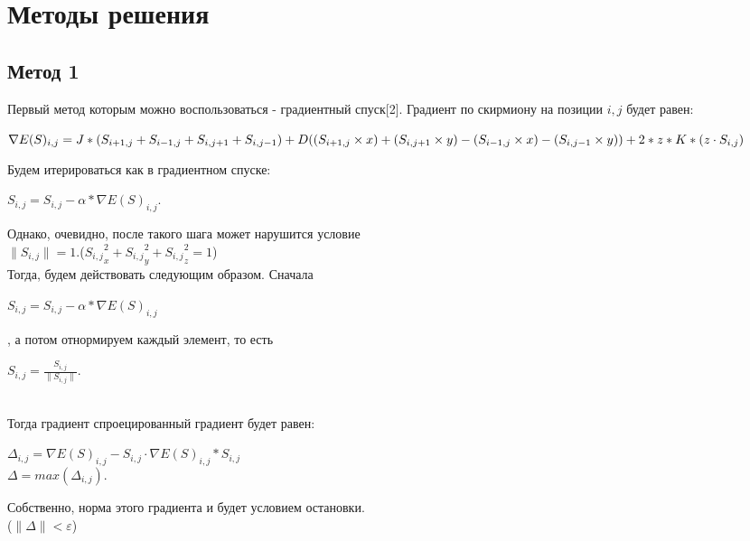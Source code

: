 \documentclass[ 12pt,x11names]{article}
\begin{document}
    \section{Методы решения}
    \subsection{Метод 1}
    Первый метод которым можно воспользоваться  - градиентный спуск[2]. Градиент по скирмиону на позиции $i, j$ будет равен:
      \begin{center}
    $\nabla E(S)_{i, j} = J * (S_{i + 1,j} + S_{i - 1,j} + S_{i, j + 1} + S_{i, j - 1})
        + \\ D  ( (S_{i + 1,j} \times x) + (S_{i, j + 1} \times y) -  (S_{i - 1, j} \times x) - (S_{i, j - 1} \times y) )\\
        + 2 * z * K * (z \cdot S_{i, j})$\\
          \end{center}
    Будем  итерироваться как в градиентном спуске:
    \begin{center}
    $S_{i, j} = S_{i, j} - \alpha * \nabla E(S)_{i, j}$.\\
    \end{center}
    Однако, очевидно, после такого шага может  нарушится условие\\ $\|S_{i, j}\| = 1$.(${S_{i,j}}_x^2 + {S_{i,j}}_y^2 + {S_{i,j}}_z^2 = 1$)\\
    Тогда, будем действовать следующим образом. Сначала \\
    \begin{center}
    $S_{i, j} = S_{i, j} - \alpha * \nabla E(S)_{i, j}$
    \end{center}, а потом отнормируем каждый элемент, то есть \begin{center}$S_{i, j} = \frac{S_{i, j}}{\|S_{i, j}\|}$.\end{center}\\
    Тогда градиент спроецированный градиент будет равен:\\
    \begin{center}
    $\Delta_{i, j} = \nabla E(S)_{i, j} - S_{i, j} \cdot \nabla E(S)_{i, j} * S_{i, j}$\\
    $\Delta = max(\Delta_{i, j}).$\\
    \end{center}
    Собственно, норма этого градиента и будет условием остановки.\\
    ($\| \Delta \|< \varepsilon$)\\
\end{document}
